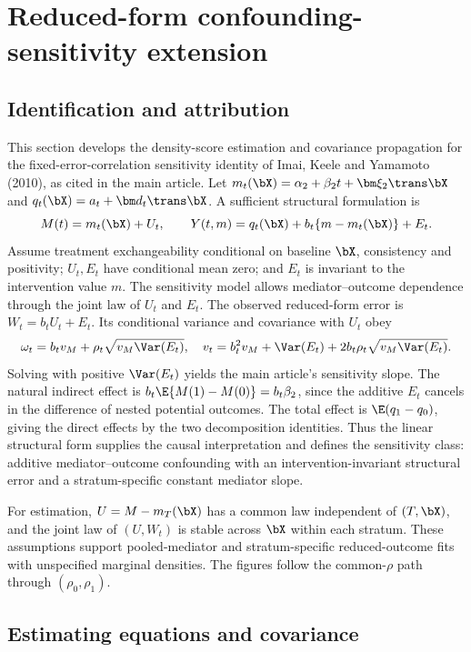 \clearpage
\section{Reduced-form confounding-sensitivity extension}
\label{sec:confounding-supp}

\subsection{Identification and attribution}

This section develops the density-score estimation and covariance propagation for the fixed-error-correlation sensitivity identity of Imai, Keele and Yamamoto (2010), as cited in the main article. Let $m_t(\bX)=\alpha_2+\beta_2t+\bm\xi_2\trans\bX$ and $q_t(\bX)=a_t+\bm d_t\trans\bX$. A sufficient structural formulation is
\[
M(t)=m_t(\bX)+U_t,\qquad
Y(t,m)=q_t(\bX)+b_t\{m-m_t(\bX)\}+E_t.
\]
Assume treatment exchangeability conditional on baseline $\bX$, consistency and positivity; $U_t,E_t$ have conditional mean zero; and $E_t$ is invariant to the intervention value $m$. The sensitivity model allows mediator--outcome dependence through the joint law of $U_t$ and $E_t$. The observed reduced-form error is $W_t=b_tU_t+E_t$. Its conditional variance and covariance with $U_t$ obey
\[
\omega_t=b_tv_M+\rho_t\sqrt{v_M\Var(E_t)},\quad
v_t=b_t^2v_M+\Var(E_t)+2b_t\rho_t\sqrt{v_M\Var(E_t)}.
\]
Solving with positive $\Var(E_t)$ yields the main article's sensitivity slope. The natural indirect effect is $b_t\E\{M(1)-M(0)\}=b_t\beta_2$, since the additive $E_t$ cancels in the difference of nested potential outcomes. The total effect is $\E(q_1-q_0)$, giving the direct effects by the two decomposition identities. Thus the linear structural form supplies the causal interpretation and defines the sensitivity class: additive mediator--outcome confounding with an intervention-invariant structural error and a stratum-specific constant mediator slope.

For estimation, $U=M-m_T(\bX)$ has a common law independent of $(T,\bX)$, and the joint law of $(U,W_t)$ is stable across $\bX$ within each stratum. These assumptions support pooled-mediator and stratum-specific reduced-outcome fits with unspecified marginal densities. The figures follow the common-$\rho$ path through $(\rho_0,\rho_1)$.

\subsection{Estimating equations and covariance}

